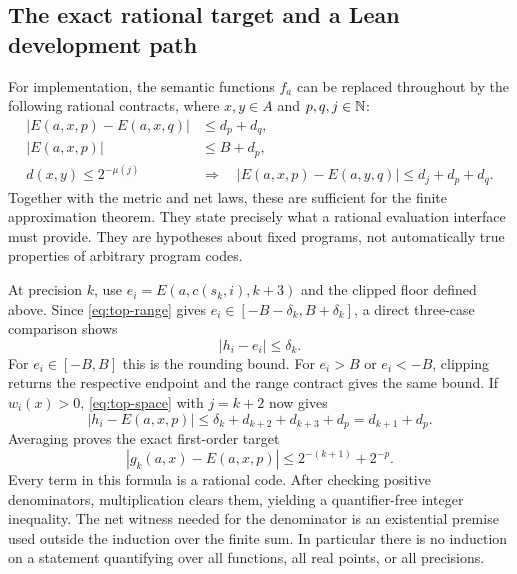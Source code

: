 \subsection{The exact rational target and a Lean development path}

For implementation, the semantic functions $f_a$ can be replaced
throughout by the following rational contracts, where $x,y\in A$ and
$p,q,j\in\mathbb N$:
\begin{align}
 |E(a,x,p)-E(a,x,q)|&\le d_p+d_q,\label{eq:top-name}\\
 |E(a,x,p)|&\le B+d_p,\label{eq:top-range}\\
 d(x,y)\le2^{-\mu(j)}\quad&\Longrightarrow\quad
 |E(a,x,p)-E(a,y,q)|\le d_j+d_p+d_q.
 \label{eq:top-space}
\end{align}
Together with the metric and net laws, these are sufficient for the
finite approximation theorem.  They state precisely what a rational
evaluation interface must provide.  They are hypotheses about fixed
programs, not automatically true properties of arbitrary program
codes.

At precision $k$, use $e_i=E(a,c(s_k,i),k+3)$ and the clipped floor
defined above.  Since \eqref{eq:top-range} gives
$e_i\in[-B-\delta_k,B+\delta_k]$, a direct three-case comparison
shows
\[
 |h_i-e_i|\le\delta_k.
\]
For $e_i\in[-B,B]$ this is the rounding bound.  For $e_i>B$ or
$e_i<-B$, clipping returns the respective endpoint and the range
contract gives the same bound.  If $w_i(x)>0$,
\eqref{eq:top-space} with $j=k+2$ now gives
\[
 |h_i-E(a,x,p)|
 \le\delta_k+d_{k+2}+d_{k+3}+d_p
 =d_{k+1}+d_p.
\]
Averaging proves the exact first-order target
\begin{equation}\label{eq:top-object-target}
 \boxed{\quad
 |g_k(a,x)-E(a,x,p)|\le 2^{-(k+1)}+2^{-p}.
 \quad}
\end{equation}
Every term in this formula is a rational code.  After checking
positive denominators, multiplication clears them, yielding a
quantifier-free integer inequality.  The net witness needed for the
denominator is an existential premise used outside the induction over
the finite sum.  In particular there is no induction on a statement
quantifying over all functions, all real points, or all precisions.

